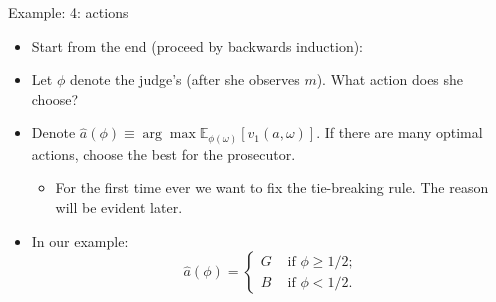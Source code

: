 \documentclass[english,10pt
,aspectratio=169
]{beamer}
\begin{document}
\begin{frame}{Example: 4: actions}
\begin{itemize}
	\item Start from the end (proceed by backwards induction):
	\item Let $\phi$ denote the judge's  (after she observes $m$). What action does she choose?
	\item Denote $\hat{a}(\phi) \equiv \arg \max \mathbb{E}_{\phi(\omega)} [v_1(a,\omega)]$. If there are many optimal actions, choose the best for the prosecutor.
	\begin{itemize}
		\item For the first time ever we want to fix the tie-breaking rule. The reason will be evident later.
	\end{itemize}
	\pause
	\item In our example:
	\begin{equation*}
		\hat{a}(\phi) = \begin{cases}
			G & \text{ if } \phi \geq 1/2;
			\\
			B & \text{ if } \phi < 1/2.
		\end{cases}
	\end{equation*}
\end{itemize}
\end{frame}
\end{document}

